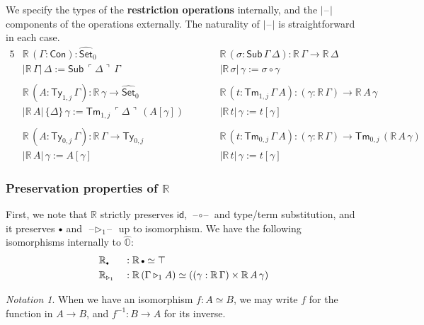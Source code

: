 \documentclass[acmsmall,review]{acmart}
\newcommand{\msf}[1]{\mathsf{#1}}
\newcommand{\mbb}[1]{\mathbb{#1}}
\newcommand{\wh}[1]{\widehat{#1}}
\newcommand{\ext}{\triangleright}
\newcommand{\mbbo}{\mbb{O}}
\newcommand{\Con}{\msf{Con}}
\newcommand{\Sub}{\msf{Sub}}
\newcommand{\Ty}{\msf{Ty}}
\newcommand{\Tm}{\msf{Tm}}
\newcommand{\emptycon}{\scaleobj{.75}\bullet}
\newcommand{\id}{\msf{id}}
\newcommand{\Set}{\mathsf{Set}}
\newcommand{\blank}{{\mathord{\hspace{1pt}\text{--}\hspace{1pt}}}}
\newcommand{\emb}[1]{\ulcorner#1\urcorner}
\newcommand{\hato}{\bm\hat{\mbbo}}
\newcommand{\re}{\mbb{R}}
\theoremstyle{remark}
\newtheorem{notation}{Notation}
\newcommand{\whset}{\wh{\Set}}
\begin{document}
\begin{definition}\label{def:restriction} We specify the types of the \textbf{restriction operations} internally, and the $|\blank|$
components of the operations externally. The naturality of $|\blank|$ is
straightforward in each case.
\begingroup
\begin{alignat*}{5}
  & \re\,(\Gamma : \Con) : \whset_0 && \re\,(\sigma : \Sub\,\Gamma\,\Delta) : \re\,\Gamma \to \re\,\Delta \\
  & |\re\,\Gamma|\,\Delta := \Sub\,\emb{\Delta}\,\Gamma && |\re\,\sigma|\,\gamma := \sigma \circ \gamma \\
  & \\
  & \re\,(A : \Ty_{1,j}\,\Gamma) : \re\,\gamma \to \whset_0 && \re\,(t : \Tm_{1,j}\,\Gamma\,A) : (\gamma : \re\,\Gamma) \to \re\,A\,\gamma \\
  & |\re\,A|\,\{\Delta\}\,\gamma := \Tm_{1,j}\,\emb{\Delta}\,(A[\gamma])\hspace{2em} && |\re\,t|\,\gamma := t[\gamma]\\
  & \\
  & \re\,(A : \Ty_{0,j}\,\Gamma) : \re\,\Gamma \to \Ty_{0,j}\hspace{2em} && \re\,(t : \Tm_{0,j}\,\Gamma\,A) : (\gamma : \re\,\Gamma) \to \Tm_{0,j}\,(\re\,A\,\gamma)\\
  & |\re\,A|\,\gamma := A[\gamma] && |\re\,t|\,\gamma := t[\gamma]
\end{alignat*}
\endgroup
\end{definition}

\subsubsection{Preservation properties of $\re$}
First, we note that $\re$ strictly preserves $\id$, $\blank\circ\blank$ and
type/term substitution, and it preserves $\emptycon$ and $\blank\ext_1\blank$ up
to isomorphism. We have the following isomorphisms internally to $\hato$:
\begin{alignat*}{3}
  & \re_{\emptycon} &&: \re\,\emptycon \simeq \top \\
  & \re_{\ext_1}   &&: \re\,(\Gamma \ext_1 A) \simeq ((\gamma : \re\,\Gamma) \times \re\,A\,\gamma)
\end{alignat*}

\begin{notation} When we have an isomorphism $f : A \simeq B$, we may write $f$ for the
  function in $A \to B$, and $f^{-1} : B \to A$ for its inverse.
\end{notation}
\end{document}
